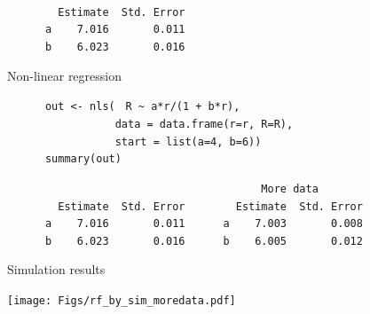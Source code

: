 \documentclass[12pt]{article}
\newcommand{\headsize}{\fontsize{35}{35} \selectfont}
\newcommand{\textsize}{\fontsize{30}{35} \selectfont}
\begin{document}
\vspace{15mm}

\color{mywhite}
\verb|                            | \\
\verb|        Estimate  Std. Error| \\
\verb|      a    7.016       0.011| \\
\verb|      b    6.023       0.016|

\newpage


\addtocounter{page}{-1}

\headsize \color{myyellow}
\hfill \begin{minipage}{5.75in}
\centering
Non-linear regression
\end{minipage}


\vspace{30mm}

\textsize 
{\color{myblue}
\verb|      out <- nls(| {\tt \color{mypink} R \verb|~| a*r/(1 + b*r)}\verb|,| \\
\verb|                 data = data.frame(r=r, R=R),| \\
\verb|                 start = list(a=4, b=6))| \\
\verb|      summary(out)|
}

\vspace{15mm}

\color{mypink}
\verb|                                        More data       | \\
\color{mywhite}
\verb|        Estimate  Std. Error        Estimate  Std. Error| \\
\verb|      a    7.016       0.011      a    7.003       0.008| \\
\verb|      b    6.023       0.016      b    6.005       0.012|


\newpage


\headsize \color{myyellow}
\hfill \begin{minipage}{5.75in}
\centering
Simulation results
\end{minipage}

\vfill

\centerline{\texttt{[image: Figs/rf\_by\_sim\_moredata.pdf]}}

\vspace{15mm}

\newpage

\end{document}

